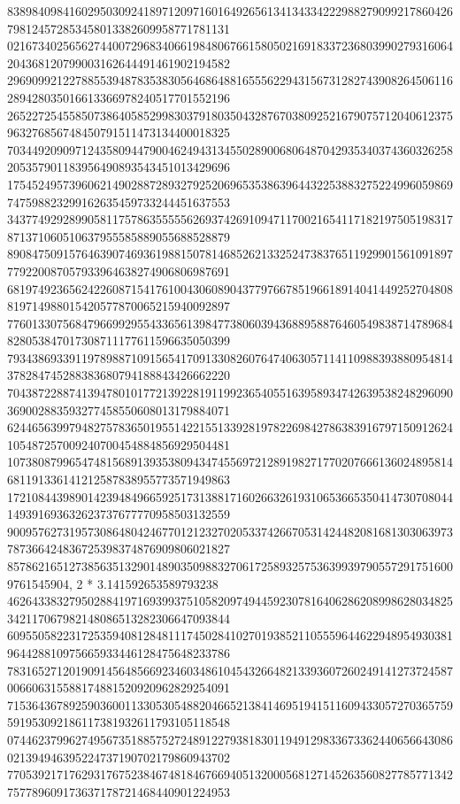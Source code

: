 \begin{DoxyCode}
      838984098416029503092418971209716016492656134134334222988279099217860426798124572853458013382609958771781131
      021673402565627440072968340661984806766158050216918337236803990279316064204368120799003162644491461902194582
      296909921227885539487835383056468648816555622943156731282743908264506116289428035016613366978240517701552196
      265227254558507386405852998303791803504328767038092521679075712040612375963276856748450791511473134400018325
      703449209097124358094479004624943134550289006806487042935340374360326258205357901183956490893543451013429696
      175452495739606214902887289327925206965353863964432253883275224996059869747598823299162635459733244451637553
      343774929289905811757863555556269374269109471170021654117182197505198317871371060510637955585889055688528879
      890847509157646390746936198815078146852621332524738376511929901561091897779220087057933964638274906806987691
      681974923656242260871541761004306089043779766785196618914041449252704808819714988015420577870065215940092897
      776013307568479669929554336561398477380603943688958876460549838714789684828053847017308711177611596635050399
      793438693391197898871091565417091330826076474063057114110988393880954814378284745288383680794188843426662220
      704387228874139478010177213922819119923654055163958934742639538248296090369002883593277458550608013179884071
      624465639979482757836501955142215513392819782269842786383916797150912624105487257009240700454884856929504481
      107380879965474815689139353809434745569721289198271770207666136024895814681191336141212587838955773571949863
      172108443989014239484966592517313881716026632619310653665350414730708044149391693632623737677770958503132559
      900957627319573086480424677012123270205337426670531424482081681303063973787366424836725398374876909806021827
      8578621651273856351329014890350988327061725893257536399397905572917516009761545904, 2 * 3.141592653589793238
      462643383279502884197169399375105820974944592307816406286208998628034825342117067982148086513282306647093844
      609550582231725359408128481117450284102701938521105559644622948954930381964428810975665933446128475648233786
      783165271201909145648566923460348610454326648213393607260249141273724587006606315588174881520920962829254091
      715364367892590360011330530548820466521384146951941511609433057270365759591953092186117381932611793105118548
      074462379962749567351885752724891227938183011949129833673362440656643086021394946395224737190702179860943702
      770539217176293176752384674818467669405132000568127145263560827785771342757789609173637178721468440901224953

\end{DoxyCode}
